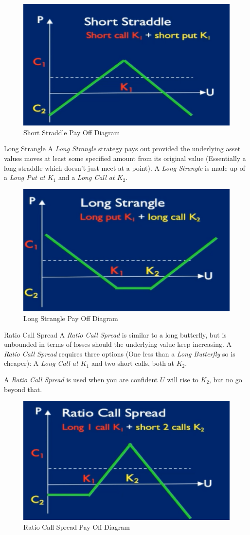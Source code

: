 \documentclass[11pt,a4paper]{article}
\begin{document}
  \begin{figure}[ht!]
    \centering
    \includegraphics[width=.5\textwidth]{shortStraddle.PNG}
    \caption{Short  Straddle Pay Off Diagram}
  \end{figure}

  \begin{definition}{Long Strangle}
    A \textit{Long Strangle} strategy pays out provided the underlying asset values moves at least some specified amount from its original value (Essentially a long straddle which doesn't just meet at a point). A \textit{Long Strangle} is made up of a \textit{Long Put at $K_1$} and a \textit{Long Call at $K_2$}.
  \end{definition}

  \begin{figure}[ht!]
    \centering
    \includegraphics[width=.5\textwidth]{longStrangle.PNG}
    \caption{Long Strangle  Pay Off Diagram}
  \end{figure}

  \begin{definition}{Ratio Call Spread}
    A \textit{Ratio Call Spread} is similar to a long butterfly, but is unbounded in terms of losses should the underlying value keep increasing. A \textit{Ratio Call Spread} requires three options (One less than a \textit{Long Butterfly} so is cheaper): A \textit{Long Call at $K_1$} and two short calls, both at $K_2$.
    \par A \textit{Ratio Call Spread} is used when you are confident $U$ will rise to $K_2$, but no go beyond that.
  \end{definition}

  \begin{figure}[ht!]
    \centering
    \includegraphics[width=.5\textwidth]{ratioCallSpread.PNG}
    \caption{Ratio Call Spread Pay Off Diagram}
  \end{figure}
\end{document}
